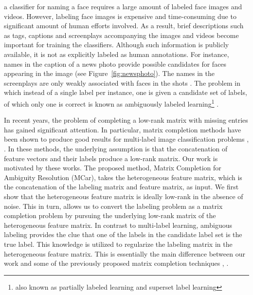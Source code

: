 \documentclass[10pt,journal,compsoc]{IEEEtran}
\begin{document}
\maketitle




 a classifier for naming a face requires a large amount of labeled face images and videos.  However, labeling face images is expensive and time-consuming due to significant amount of human efforts involved.  As a result, brief descriptions such as tags, captions and screenplays accompanying the images and videos become important for training the classifiers.  Although such information is publicly available, it is not as explicitly labeled as human annotations.  For instance, names in the caption of a news photo provide possible candidates for faces appearing in the image \cite{Berg2004,Berg20041} (see Figure~\ref{fig:newsphoto}).  The names in the screenplays are only weakly associated with faces in the shots \cite{Everingham2006ReID}.  The problem in which instead of a single label per instance, one is given a candidate set of labels, of which only one is correct is known as ambiguously labeled learning\footnote{also known as partially labeled learning and superset label learning} \cite{Hullermeier2006,Cour2009,Liu2012acm,Chen2013,Liu2014lot}.


In recent years, the problem of completing a low-rank matrix with missing entries has gained significant attention. In particular, matrix completion methods have been shown to produce good results for multi-label image classification problems \cite{Goldberg2010}, \cite{Cabral2011}. In these methods, the underlying assumption is that the concatenation of feature vectors and their labels produce a low-rank matrix.  Our work is motivated by these works.  The proposed method, Matrix Completion for Ambiguity Resolution (MCar), takes the heterogeneous feature matrix, which is the concatenation of the labeling matrix and feature matrix, as input. We first show that the heterogeneous feature matrix is ideally low-rank in the absence of noise.  This in turn, allows us to convert the labeling problem as a matrix completion problem by pursuing the underlying low-rank matrix of the heterogeneous feature matrix. In contrast to multi-label learning, ambiguous labeling provides the clue that one of the labels in the candidate label set is the true label. This knowledge is utilized to regularize the labeling matrix in the heterogeneous feature matrix.  This is essentially the main difference between our work and some of the previously proposed matrix completion techniques \cite{Goldberg2010}, \cite{Cabral2011}.
\end{document}
